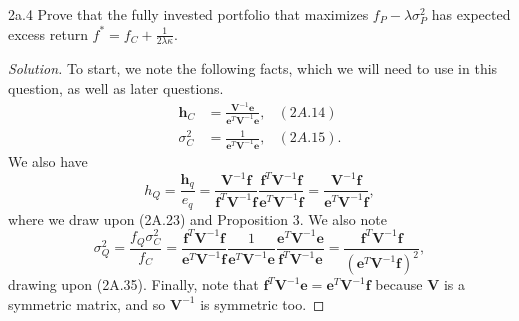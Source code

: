 \begin{problem}{2a.4}
Prove that the fully invested portfolio that maximizes $f_{P} - \lambda\sigma_{P}^{2}$ has expected excess return $f^{\ast} = f_{C} + \frac{1}{2\lambda\kappa}$.
\end{problem}

\begin{proof}[Solution]
To start, we note the following facts, which we will need to use in this question, as well as later questions.
\begin{align*}
\mathbf{h}_{C} &= \frac{\mathbf{V}^{-1}\mathbf{e}}{\mathbf{e}^{T}\mathbf{V}^{-1}\mathbf{e}}, & (2A.14)\\
\sigma_{C}^{2} &= \frac{1}{\mathbf{e}^{T}\mathbf{V}^{-1}\mathbf{e}}, & (2A.15).
\end{align*}
We also have \[h_{Q} = \frac{\mathbf{h}_{q}}{e_{q}} = \frac{\mathbf{V}^{-1}\mathbf{f}}{\mathbf{f}^{T}\mathbf{V}^{-1}\mathbf{f}}\frac{\mathbf{f}^{T}\mathbf{V}^{-1}\mathbf{f}}{\mathbf{e}^{T}\mathbf{V}^{-1}\mathbf{f}} = \frac{\mathbf{V}^{-1}\mathbf{f}}{\mathbf{e}^{T}\mathbf{V}^{-1}\mathbf{f}},\] where we draw upon (2A.23) and Proposition 3. We also note \[\sigma_{Q}^{2} = \frac{f_{Q}\sigma_{C}^{2}}{f_{C}} = \frac{\mathbf{f}^{T}\mathbf{V}^{-1}\mathbf{f}}{\mathbf{e}^{T}\mathbf{V}^{-1}\mathbf{f}}\frac{1}{\mathbf{e}^{T}\mathbf{V}^{-1}\mathbf{e}}\frac{\mathbf{e}^{T}\mathbf{V}^{-1}\mathbf{e}}{\mathbf{f}^{T}\mathbf{V}^{-1}\mathbf{e}} = \frac{\mathbf{f}^{T}\mathbf{V}^{-1}\mathbf{f}}{(\mathbf{e}^{T}\mathbf{V}^{-1}\mathbf{f})^{2}},\] drawing upon (2A.35). Finally, note that $\mathbf{f}^{T}\mathbf{V}^{-1}\mathbf{e} = \mathbf{e}^{T}\mathbf{V}^{-1}\mathbf{f}$ because $\mathbf{V}$ is a symmetric matrix, and so $\mathbf{V}^{-1}$ is symmetric too.


\end{proof}
